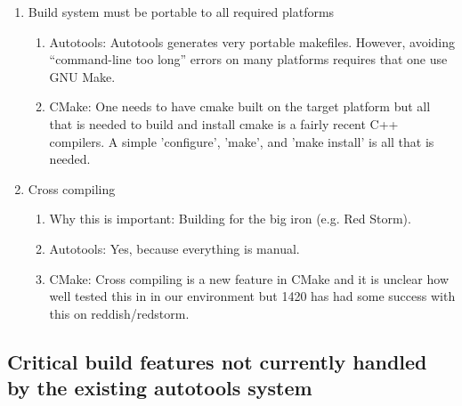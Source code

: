 \documentclass[pdf,ps2pdf,11pt]{SANDreport}
\begin{document}
\begin{enumerate}
{}\item Build system must be portable to all required platforms

  \begin{enumerate}

  {}\item Autotools: Autotools generates very portable makefiles.
  However, avoiding ``command-line too long'' errors on many
  platforms requires that one use GNU Make.

  {}\item CMake: One needs to have cmake built on the target
  platform but all that is needed to build and install cmake is a
  fairly recent C++ compilers.  A simple 'configure', 'make', and
  'make install' is all that is needed. 

  \end{enumerate}

{}\item Cross compiling

  \begin{enumerate}

  {}\item Why this is important: Building for the big iron (e.g. Red Storm).

  {}\item Autotools: Yes, because everything is manual.

  {}\item CMake: Cross compiling is a new feature in CMake and it is
  unclear how well tested this in in our environment but 1420 has had
  some success with this on reddish/redstorm.

  \end{enumerate}

\end{enumerate}

%
{}\subsection{Critical build features not currently handled by the
existing autotools system}
%
\end{document}
